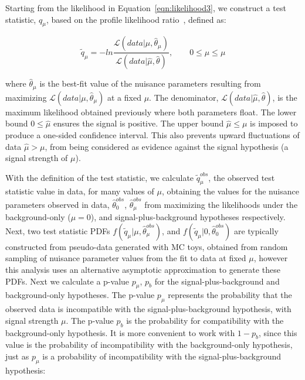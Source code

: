 Starting from the likelihood in Equation~\ref{eqn:likelihood3}, we construct a test statistic, $q_{\mu}$, based on the profile likelihood ratio~\cite{AsymptoticLimits},
defined as:

\begin{equation}
\label{eqn:test_stat}
\tilde{q}_{\mu} = -ln \frac{\mathcal{L}(data|\mu,\hat{\theta}_{\mu})}{\mathcal{L}(data|\hat{\mu},\hat{\theta})},~~~~~~~~~0 \leq \hat{\mu} \leq{\mu}
\end{equation}

\noindent where $\hat{\theta}_{\mu}$ is the best-fit value of the nuisance parameters resulting from maximizing $\mathcal{L}(data|\mu,\hat{\theta}_{\mu})$ at a fixed $\mu$. 
The denominator, $\mathcal{L}(data|\hat{\mu},\hat{\theta})$, is the maximum likelihood obtained
previously where both parameters float. The lower bound $0 \leq \hat{\mu}$ ensures the signal is positive.
The upper bound $\hat{\mu} \leq \mu$ is imposed to produce a one-sided confidence interval. This also prevents upward fluctuations of data $\hat{\mu} > \mu$, 
from being considered as evidence against the signal hypothesis (a signal strength of $\mu$).

With the definition of the test statistic, we calculate $\tilde{q}_{\mu}^{obs}$, the observed test statistic value in data,
for many values of $\mu$, obtaining the values for the nuisance parameters observed in data, $\hat{\theta}_{0}^{obs}$, $\hat{\theta}_{\mu}^{obs}$
from maximizing the likelihoods under the background-only ($\mu=0$), and signal-plus-background hypotheses respectively.
Next, two test statistic PDFs
$f(\tilde{q}_{\mu}|\mu,\hat{\theta}_{\mu}^{obs})$, and $f(\tilde{q}_{\mu}|0,\hat{\theta}_{0}^{obs})$ are typically constructed from pseudo-data
generated with MC toys, obtained from random sampling of nuisance parameter values from the fit to data at fixed $\mu$, however this analysis uses an alternative
asymptotic approximation to generate these PDFs. Next we calculate a p-value $p_{\mu}$, $p_{b}$
for the signal-plus-background and background-only hypotheses. The p-value $p_{\mu}$ represents the probability that the observed data is incompatible with the
signal-plus-background hypothesis, with signal strength $\mu$.
The p-value $p_{b}$ is the probability for compatibility with the background-only hypothesis.
It is more convenient to work with $1-p_{b}$, since this value is the probability of incompatibility with the background-only hypothesis,
just as $p_{\mu}$ is a probability of incompatibility with the signal-plus-background hypothesis:

